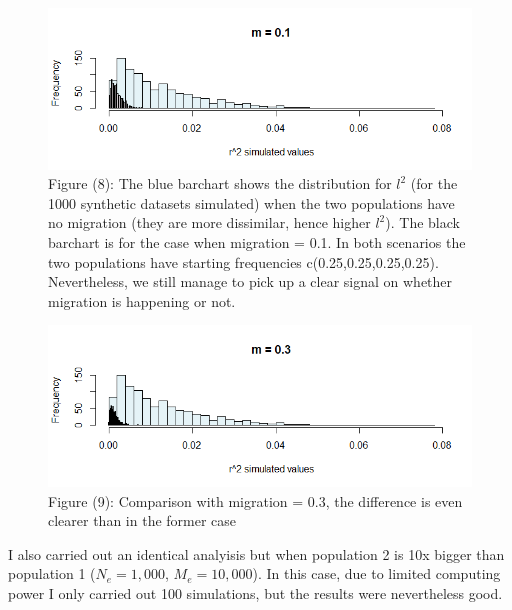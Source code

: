 \documentclass[a4paper,12pt]{article}
\begin{document}
\begin{figure}[H]
    
    \includegraphics[scale=0.8]{8.png}%
    \caption*{Figure (8): The blue barchart shows the distribution for $l^2$  (for the 1000 synthetic datasets simulated) when the two populations have no migration (they are more dissimilar, hence higher $l^2$).
The black barchart is for the case when migration = 0.1.
In both scenarios the two populations have starting frequencies c(0.25,0.25,0.25,0.25).
Nevertheless, we still manage to pick up a clear signal on whether migration is happening or not.
}%
\end{figure}%

\begin{figure}[H]
    
    \includegraphics[scale=0.8]{9.png}%
    \caption*{Figure (9): Comparison with migration = 0.3, the difference is even clearer than in the former case 
}%
\end{figure}%

I also carried out an identical analyisis but when population 2 is 10x bigger than population 1 ($N_e = 1,000$, $M_e = 10,000$).
In this case, due to limited computing power I only carried out 100 simulations, but the results were nevertheless good.
\end{document}
